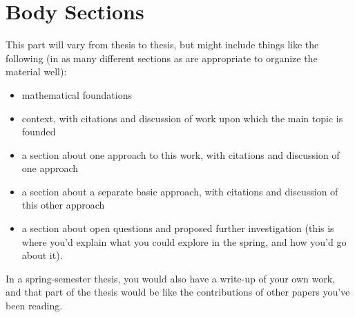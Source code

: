 \section{Body Sections}

This part will vary from thesis to thesis, but might include things like the following
(in as many different sections as are appropriate to organize the material well):

\begin{itemize}
\item mathematical foundations
\item context, with citations and discussion of work upon which the main topic is founded
\item a section about one approach to this work, with citations and discussion of one approach
\item a section about a separate basic approach, with citations and discussion of this other approach
\item a section about open questions and proposed further investigation (this is where you'd explain what you could explore in the spring, and how you'd go about it).
\end{itemize}

In a spring-semester thesis, you would also have a write-up of your own work,
and that part of the thesis would be like the contributions of other papers
you've been reading.
